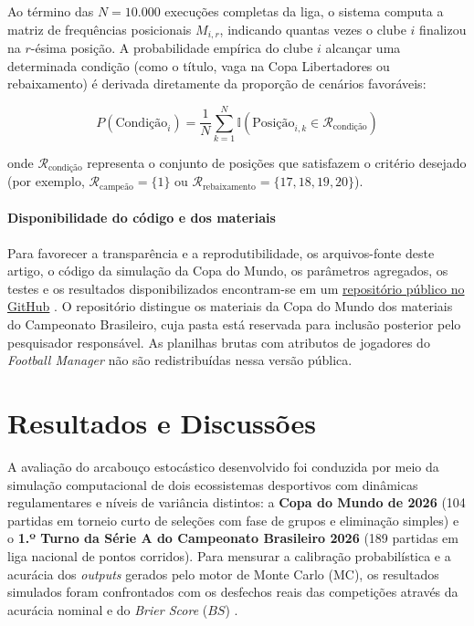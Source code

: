 \documentclass[12pt]{article}
\begin{document}
Ao término das $N = 10.000$ execuções completas da liga, o sistema computa a matriz de frequências posicionais $M_{i, r}$, indicando quantas vezes o clube $i$ finalizou na $r$-ésima posição. A probabilidade empírica do clube $i$ alcançar uma determinada condição (como o título, vaga na Copa Libertadores ou rebaixamento) é derivada diretamente da proporção de cenários favoráveis:

\begin{equation}
	P(\text{Condição}_i) = \frac{1}{N} \sum_{k=1}^{N} \mathbb{I} \left( \text{Posição}_{i, k} \in \mathcal{R}_{\text{condição}} \right)
	\label{eq:montecarlo_seriea}
\end{equation}

onde $\mathcal{R}_{\text{condição}}$ representa o conjunto de posições que satisfazem o critério desejado (por exemplo, $\mathcal{R}_{\text{campeão}} = \{1\}$ ou $\mathcal{R}_{\text{rebaixamento}} = \{17, 18, 19, 20\}$).


\paragraph{Disponibilidade do código e dos materiais}
Para favorecer a transparência e a reprodutibilidade, os arquivos-fonte deste artigo, o código da simulação da Copa do Mundo, os parâmetros agregados, os testes e os resultados disponibilizados encontram-se em um \href{https://github.com/warner03/Previs-o_de_Resultados_no_Futebol-via-Simula-o-de-Monte-Carlo_Football-Manager_Base-de-Dados}{repositório público no GitHub} \cite{repositorio_futebol_2026}. O repositório distingue os materiais da Copa do Mundo dos materiais do Campeonato Brasileiro, cuja pasta está reservada para inclusão posterior pelo pesquisador responsável. As planilhas brutas com atributos de jogadores do \textit{Football Manager} não são redistribuídas nessa versão pública.


\section{Resultados e Discussões}

A avaliação do arcabouço estocástico desenvolvido foi conduzida por meio da simulação computacional de dois ecossistemas desportivos com dinâmicas regulamentares e níveis de variância distintos: a \textbf{Copa do Mundo de 2026} (104 partidas em torneio curto de seleções com fase de grupos e eliminação simples) e o \textbf{1.º Turno da Série A do Campeonato Brasileiro 2026} (189 partidas em liga nacional de pontos corridos). Para mensurar a calibração probabilística e a acurácia dos \textit{outputs} gerados pelo motor de Monte Carlo (MC), os resultados simulados foram confrontados com os desfechos reais das competições através da acurácia nominal e do \textit{Brier Score} ($BS$) \cite{steyerberg2010assessing}.
\end{document}
